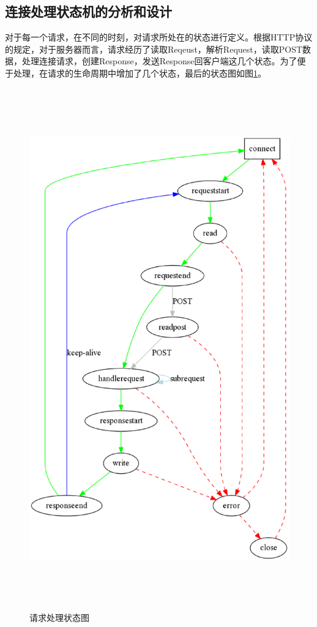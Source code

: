 \documentclass[12pt, twoside, a4paper, xetex]{report}
\begin{document}
\subsection{连接处理状态机的分析和设计}
	对于每一个请求，在不同的时刻，对请求所处在的状态进行定义。根据HTTP协议的规定，对于服务器而言，请求经历了读取Reqeust，解析Request，读取POST数据，处理连接请求，创建Response，发送Response回客户端这几个状态。为了便于处理，在请求的生命周期中增加了几个状态，最后的状态图如图\ref{state}。
	\begin{figure}[htbp]
	\centering
	\caption{请求处理状态图}
	\label{state}
	\includegraphics[height=22.5cm, width=14.5cm]{pics/state.eps}
	\end{figure}
	
\end{document}
